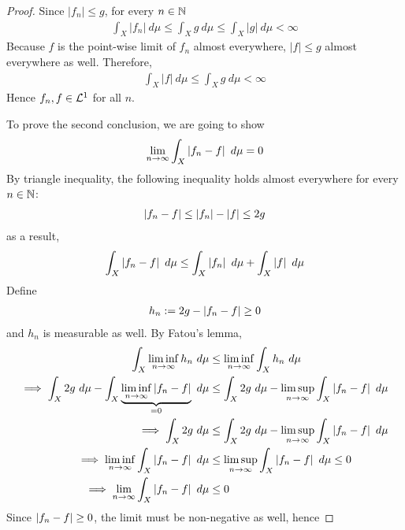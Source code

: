 \documentclass[11pt]{article}
\begin{document}
	\begin{proof}
	    Since $|f_n| \leq g$, for every $n \in \mathbb{N}$
	    \begin{align}
	        \int_X |f_n|\ d\mu \leq \int_X g\ d\mu \leq \int_X |g|\ d\mu < \infty
	    \end{align}
	    Because $f$ is the point-wise limit of $f_n$ almost everywhere, $|f| \leq g$ almost everywhere as well.
	    Therefore,
	    \begin{align}
	        \int_X |f|\ d\mu \leq \int_X g\ d\mu < \infty
	    \end{align}
	    Hence $f_n, f \in \mathcal{{L}}^1$ for all $n$.
	    
	    To prove the second conclusion, we are going to show
	    \begin{align}
	        \lim_{n \to \infty} \int_X \left \vert {f_n - f} \right \vert\ d\mu = 0
	    \end{align}
	    By triangle inequality, the following inequality holds almost everywhere for every $n \in \mathbb{N}$:
	    \begin{align}
	        \left \vert {f_n - f} \right \vert \leq \left \vert {f_n} \right \vert - \left \vert {f} \right \vert \leq 2 g
	    \end{align}
	    as a result,
	    \begin{align}
	        \int_X  \left \vert {f_n - f} \right \vert\ d\mu \leq \int_X \left \vert {f_n} \right \vert\ d\mu + \int_X \left \vert {f} \right \vert\ d\mu
	    \end{align}
	    Define
	    \begin{align}
            h_n := 2g - \left \vert {f_n - f} \right \vert \geq 0
	    \end{align}
	    and $h_n$ is measurable as well. By Fatou's lemma,
	    \begin{align}
	        \int_X \liminf_{n\to\infty} h_n\ d\mu &\leq  \liminf_{n\to\infty} \int_X h_n\ d\mu \\
	        \implies
	        \int_X 2g\ d\mu - \int_X \underbrace{\liminf_{n \to \infty} \left \vert {f_n - f} \right \vert}_{=0}\ d\mu &\leq \int_X 2g\ d\mu - \limsup_{n\to\infty} \int_X \left \vert {f_n - f} \right \vert\ d\mu \\
	        \implies
	        \int_X 2g\ d\mu &\leq \int_X 2g\ d\mu - \limsup_{n\to\infty} \int_X \left \vert {f_n - f} \right \vert\ d\mu \\
	        \implies
	        \liminf_{n\to\infty} \int_X \left \vert {f_n - f} \right \vert\ d\mu &\leq \limsup_{n\to\infty} \int_X \left \vert {f_n - f} \right \vert\ d\mu \leq 0 \\
	        \implies \lim_{n \to \infty}\int_X \left \vert {f_n - f} \right \vert\ d\mu &\leq 0
	    \end{align}
	    Since $\left \vert {f_n - f} \right \vert \geq 0$, the limit must be non-negative as well, hence

\end{proof}
\end{document}
